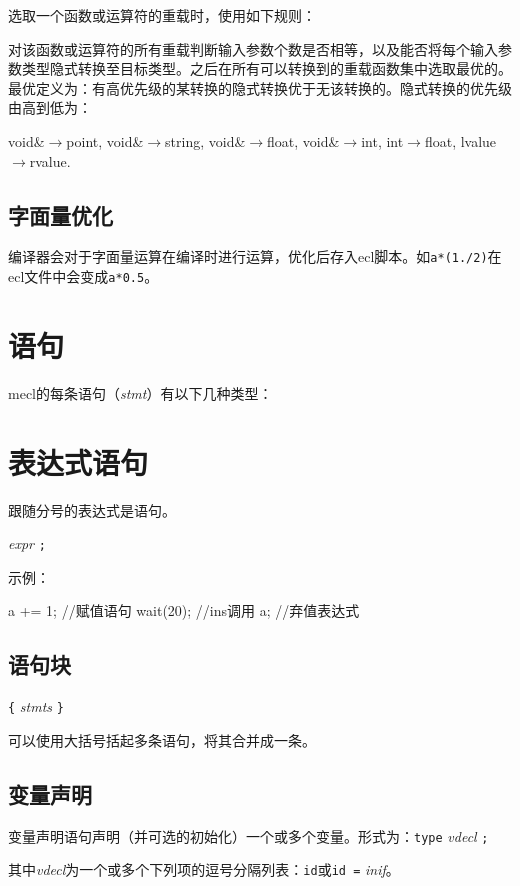 \documentclass{article}
\begin{document}
选取一个函数或运算符的重载时，使用如下规则：

对该函数或运算符的所有重载判断输入参数个数是否相等，以及能否将每个输入参数类型隐式转换至目标类型。之后在所有可以转换到的重载函数集中选取最优的。最优定义为：有高优先级的某转换的隐式转换优于无该转换的。隐式转换的优先级由高到低为：

void\&$\to$point, void\&$\to$string, void\&$\to$float, void\&$\to$int, int$\to$float, lvalue$\to$rvalue.

\subsection{字面量优化}

编译器会对于字面量运算在编译时进行运算，优化后存入ecl脚本。如\verb|a*(1./2)|在ecl文件中会变成\verb|a*0.5|。

\section{语句}
\label{yuju}

mecl的每条语句（\textit{stmt}）有以下几种类型：

\section{表达式语句}

跟随分号的表达式是语句。

\textit{expr} \verb|;|

示例：

\begin{MUAvbt}
a += 1;			//赋值语句
wait(20);		//ins调用
a;				//弃值表达式
\end{MUAvbt}

\subsection{语句块}

\verb|{| \textit{stmts} \verb|}|

可以使用大括号括起多条语句，将其合并成一条。

\subsection{变量声明}

变量声明语句声明（并可选的初始化）一个或多个变量。形式为：\verb|type| \textit{vdecl} \verb|;|

其中\textit{vdecl}为一个或多个下列项的逗号分隔列表：\verb|id|或\verb|id =| \textit{inif}。
\end{document}
